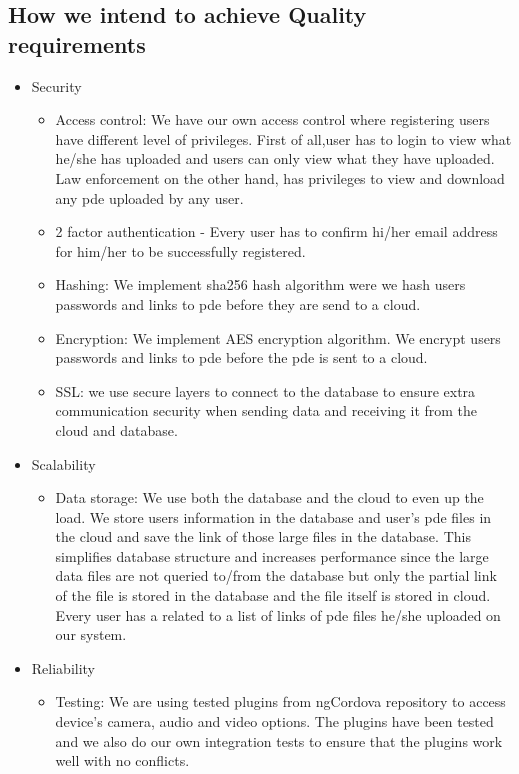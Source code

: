 \documentclass[a4paper,12pt]{article}
\begin{document}
\subsection{How we intend to achieve Quality requirements}
\begin{itemize}
\item Security
	\begin{itemize}
		\item Access control: We have our own access control where registering users have different level of privileges. First of all,user has to login to view what he/she has uploaded and users can only view what they have uploaded. Law enforcement on the other hand, has privileges to view and download any pde uploaded by any user.
		\item 2 factor authentication - Every user has to confirm hi/her email address for him/her to be successfully registered.
		\item Hashing: We implement sha256 hash algorithm were we hash users passwords and links to pde before they are send to a cloud. 
		\item Encryption: We implement AES encryption algorithm. We encrypt users passwords and links to pde before the pde is sent to a cloud. 
		\item SSL: we use secure layers to connect to the database to ensure extra communication security when sending data and receiving it from the cloud and database.
	\end{itemize}
\item Scalability
	\begin{itemize}
		\item Data storage: We use both the database and the cloud to even up the load. We store users information in the database and user's pde files in the cloud and save the link of those large files in the database. This simplifies database structure and increases performance since the large data files are not queried to/from the database but only the partial link of the file is stored in the database and the file itself is stored in cloud. Every user has a related to a list of links of pde files he/she uploaded on our system. 
	\end{itemize}
\item Reliability
	\begin{itemize}
		\item Testing: We are using tested plugins from ngCordova repository to access device's camera, audio and video options. The plugins have been tested and we also do our own integration tests to ensure that the plugins work well with no conflicts.

\end{itemize}
\end{itemize}
\end{document}
